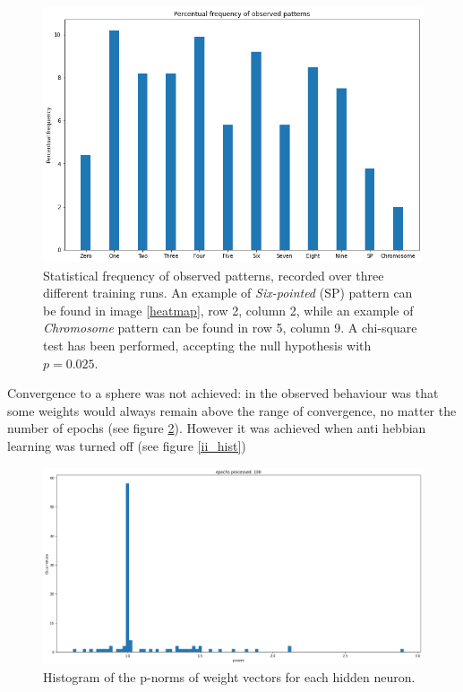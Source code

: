 \documentclass[a4paper]{report}
\begin{document}
\begin{figure} [H]
    \centering
    \includegraphics [width=12cm ] {o/bar2.png}
    \caption{Statistical frequency of observed patterns, recorded over three different training runs. An example of \textit{Six-pointed} (SP) pattern can be found in image \ref{heatmap}, row 2, column 2, while an example of \textit{Chromosome} pattern can be found in row 5, column 9. A chi-square test has been performed, accepting the null hypothesis with $p =0.025$.}
    \label{cerchio1}
\end{figure}

 Convergence to a sphere was not achieved: in the observed behaviour was that some weights would always remain above the range of convergence, no matter the number of epochs (see figure \ref{uu_hist}). However it was achieved when anti hebbian learning was turned off (see figure \ref{ii_hist})
\begin{figure} [H]
    \centering
    \includegraphics [width=12cm ] {o/uu_hist.png}
    \caption{Histogram of the p-norms of weight vectors for each hidden neuron.}
    \label{uu_hist}
\end{figure}
\end{document}
